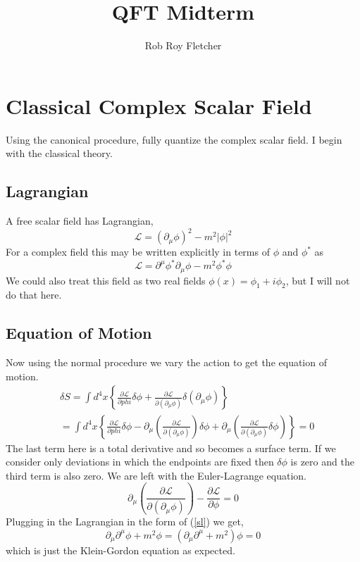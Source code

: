\documentclass{article}
\title{QFT Midterm}
\author{Rob Roy Fletcher}
\numberwithin{equation}{section}
\newcommand{\Lagr}{\mathcal{L}}  %
\newcommand{\dmu}{\partial_{\mu}}
\newcommand{\Dmu}{\partial^{\mu}}
\newcommand{\ddl}[1]{\frac{\partial \Lagr}{\partial(\partial_{#1} \phi)}}
\newcommand{\beq}{\begin{equation}}
\newcommand{\eeq}{\end{equation}}
\begin{document}
\maketitle
\section{Classical Complex Scalar Field}
Using the canonical procedure, fully quantize the complex scalar field. I begin with the classical theory.
\subsection{Lagrangian}
A free scalar field has Lagrangian,
\beq \label{sl}
    \Lagr = (\partial_\mu \phi)^2 -m^2|\phi|^2 
\eeq
For a complex field this may be written explicitly in terms of $\phi$ and $\phi^*$ as
\beq \label{csl}
    \Lagr = \Dmu \phi^* \dmu \phi - m^2 \phi^* \phi
\eeq
We could also treat this field as two real fields $\phi(x) = \phi_1 + i \phi_2$, but I will not do that here.

\subsection{Equation of Motion}
Now using the normal procedure we vary the action to get the equation of motion.
\beq \begin{split}
    &\delta S = \int d^4 x \left\{ \frac{\partial \Lagr}{\partial phi} \delta \phi + \ddl{\mu} \delta(\dmu \phi) \right\} \\
    &= \int d^4 x \left\{ \frac{\partial \Lagr}{\partial phi}\delta \phi-\dmu \left( \ddl{\mu}\right)\delta\phi+\dmu\left(\ddl{\mu} \delta\phi\right) \right\}=0
\end{split} \eeq
The last term here is a total derivative and so becomes a surface term. If we consider only deviations in which the endpoints are fixed then $\delta \phi$ is zero and the
third term is also zero. We are left with the Euler-Lagrange equation.
\beq
    \dmu\left( \ddl{\mu} \right) - \frac{\partial \Lagr}{\partial \phi} = 0
\eeq
Plugging in the Lagrangian in the form of (\ref{sl}) we get,
\beq \label{kg}
    \dmu\Dmu \phi + m^2\phi = (\dmu\Dmu + m^2)\phi = 0
\eeq 
which is just the Klein-Gordon equation as expected.

\end{document}
